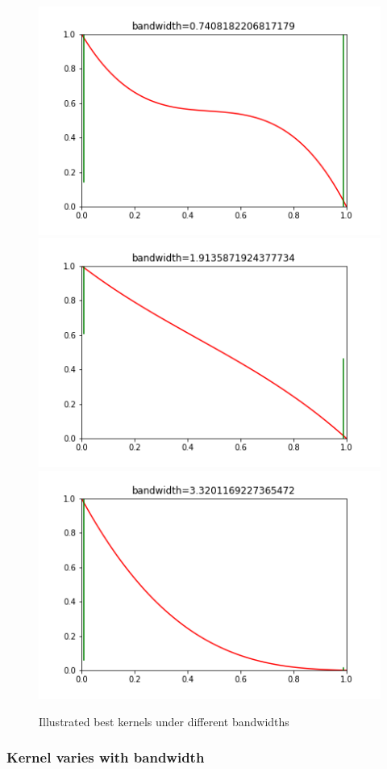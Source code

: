 \documentclass[a4 paper,12pt]{article}
\begin{document}
\begin{figure}
   \centering
   \includegraphics[scale=0.3]{case30_frame0000000.png}
   \includegraphics[scale=0.3]{case30_frame0000031.png}
   \includegraphics[scale=0.3]{case30_frame0000049.png}
   \caption{Illustrated best kernels under different bandwidths}
   \label{fig:kernels}
\end{figure}
\subsubsection*{Kernel varies with bandwidth}
\end{document}
